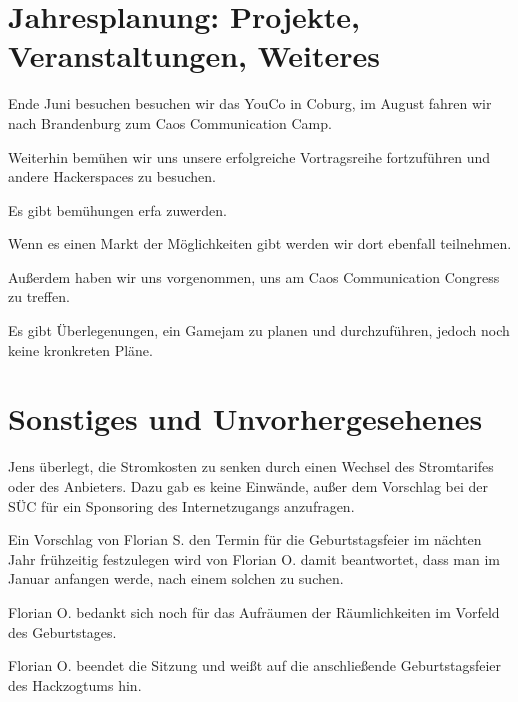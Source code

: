\section{Jahresplanung:   Projekte,   Veranstaltungen, Weiteres}
Ende Juni besuchen besuchen wir das YouCo in Coburg, im August fahren wir nach Brandenburg zum Caos Communication Camp.

Weiterhin bemühen wir uns unsere erfolgreiche Vortragsreihe fortzuführen und andere Hackerspaces zu besuchen.

Es gibt bemühungen erfa zuwerden. 

Wenn es einen Markt der Möglichkeiten gibt werden wir dort ebenfall teilnehmen.

Außerdem haben wir uns vorgenommen, uns am Caos Communication Congress zu treffen.

Es gibt Überlegenungen, ein Gamejam zu planen und durchzuführen, jedoch noch keine kronkreten Pläne.
 
\section{Sonstiges und Unvorhergesehenes}
Jens überlegt, die Stromkosten zu senken durch einen Wechsel des Stromtarifes oder des Anbieters.
Dazu gab es keine Einwände, außer dem Vorschlag bei der SÜC für ein Sponsoring des Internetzugangs anzufragen.

Ein Vorschlag von Florian S. den Termin für die Geburtstagsfeier im nächten Jahr frühzeitig festzulegen wird von Florian O. damit beantwortet, dass man im Januar anfangen werde, nach einem solchen zu suchen.

Florian O. bedankt sich noch für das Aufräumen der Räumlichkeiten im Vorfeld des Geburtstages.

 Florian O. beendet die Sitzung und weißt auf die anschließende Geburtstagsfeier des Hackzogtums hin. 
